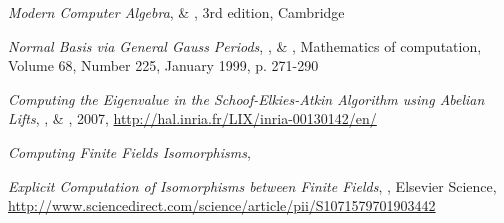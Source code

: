 \documentclass[a4paper]{article} %
\numberwithin{section}{part}
\numberwithin{equation}{section}
\begin{document}
\begin{thebibliography}{LC}
 \emph{Modern Computer Algebra},  \&
, 3rd edition, Cambridge

 \emph{Normal Basis \textup{via} General Gauss Periods},
,  \& , 
Mathematics of computation, Volume 68, Number 225, January 1999, p. 271-290

 \emph{Computing the Eigenvalue in the Schoof-Elkies-Atkin
Algorithm using Abelian Lifts}, ,  \&
, 2007, 
\url{http://hal.inria.fr/LIX/inria-00130142/en/}

 \emph{Computing Finite Fields Isomorphisms}, 

 \emph{Explicit Computation of Isomorphisms between Finite
Fields}, , Elsevier Science, 
\url{http://www.sciencedirect.com/science/article/pii/S1071579701903442}

\end{thebibliography}
\end{document}
